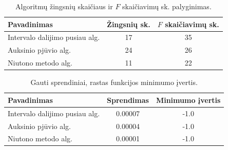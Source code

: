 \documentclass{VUMIFPSkursinis}
\begin{document}
\begin{table}[ht]
  \centering %
  \caption{Algoritmų žingsnių skaičiaus ir $F$ skaičiavimų sk. palyginimas.}
  \begin{tabular}{l c c} %
    \hline\hline %
    Pavadinimas                    & Žingsnių sk. & $F$ skaičiavimų sk. \\ [0.5ex] %
    \hline %
    Intervalo dalijimo pusiau alg. & 17           & 35                  \\ %
    Auksinio pjūvio alg.           & 24           & 26                  \\
    Niutono metodo alg.            & 11            & 22                  \\ [1ex] %
    \hline %
  \end{tabular}
  \label{table:nonlin}
\end{table}

\begin{table}[ht]
  \centering %
  \caption{Gauti sprendiniai, rastas funkcijos minimumo įvertis.}
  \begin{tabular}{l c c} %
    \hline\hline %
    Pavadinimas                    & Sprendimas        & Minimumo įvertis    \\ [0.5ex] %
    \hline %
    Intervalo dalijimo pusiau alg. & 0.00007 & -1.0 \\ %
    Auksinio pjūvio alg.           & 0.00004 & -1.0                \\
    Niutono metodo alg.            & 0.00001 & -1.0                \\ [1ex] %
    \hline %
  \end{tabular}
  \label{table:spr}
\end{table}
\end{document}
